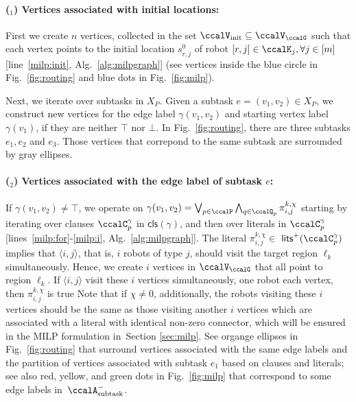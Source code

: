 \documentclass[Afour,sageh,times]{sagej}
\newcounter{mycounter}
\newcommand{\clause}[1]{\mathsf{cls}(#1)}
\newcommand{\auto}[1]{\ccalA_{\textup{#1}}}
\newcommand{\ag}[2]{\langle#1,#2\rangle}
\renewcommand{\ap}[3]{\mathcal{\pi}_{{#1},{#2}}^{#3}}
\begin{document}
\paragraph{($_1$) Vertices associated with initial locations:}\label{vertex:initial} First we create $n$ vertices, collected in the set $\ccalV_{\text{init}}\subseteq \ccalV_{\ccalG}$ such that each vertex points to the initial location $s^0_{r,j}$ of robot $[r,j]\in\ccalK_j, \forall j\in [m]$ [line~\ref{milp:init}, Alg.~\ref{alg:milpgraph}] (see vertices inside the blue circle in Fig.~\ref{fig:routing} and blue dots in Fig.~\ref{fig:milp}).

Next, we iterate over subtasks in $X_{P}$. Given a subtask $e = (v_1, v_2) \in X_{P}$, we construct new vertices for the  edge label $\gamma(v_1, v_2)$ and starting vertex label $\gamma(v_1)$, if they are neither $\top$ nor $\bot$. In Fig.~\ref{fig:routing}, there are three subtasks $e_1, e_2$ and $e_3$. Those vertices that correpond to the same subtask are surrounded by gray ellipses.

\paragraph{($_2$) Vertices associated with the edge label of subtask $e$:}\label{vertex:edge} If $\gamma(v_1, v_2) \not= \top$, we operate on $\gamma(v_1, v_2) =  \bigvee_{p\in \ccalP} \bigwedge_{q \in \ccalQ_{p}} \ap{i}{j}{k,\chi}$ starting by iterating over clauses $\ccalC_p^{\gamma}$ in $\clause{\gamma}$, and then over literals in $\ccalC_p^\gamma$ [lines~\ref{milp:for}-\ref{milp:i}, Alg.~\ref{alg:milpgraph}].
The literal $\ap{i}{j}{k,\chi}\in $ $\mathsf{lits}^+(\ccalC_p^{\gamma})$ implies that $\ag{i}{j}$, that is, $i$ robots of type $j$,  should visit the target region $\ell_k$ simultaneously. Hence, we create $i$ vertices in $\ccalV_\ccalG$  that all point to region $\ell_k$. If $\ag{i}{j}$ visit these $i$ vertices simultaneously, one robot each vertex, then $\ap{i}{j}{k,\chi}$ is true Note that if $\chi\not=0$, additionally, the robots visiting these $i$ vertices should be the same as those visiting another $i$ vertices which are associated with a literal with identical non-zero connector, which will be ensured in the MILP formulation in~Section \ref{sec:milp}. See organge ellipses in Fig.~\ref{fig:routing} that surround vertices associated with the same edge labels and the partition of vertices associated with subtask $e_1$ based on clauses and literals; see also red, yellow, and green dots in Fig.~\ref{fig:milp} that correspond to some edge labels in~$\auto{subtask}^-$.
\end{document}
